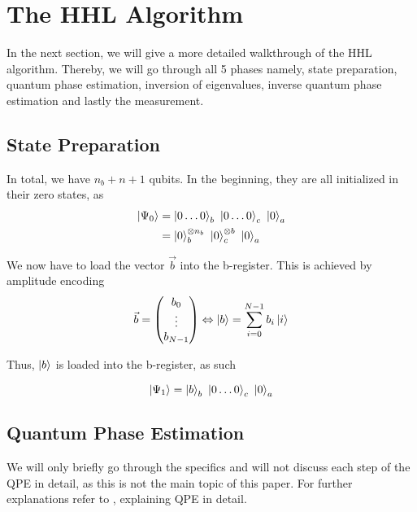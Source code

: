 \section{The HHL Algorithm}
In the next section, we will give a more detailed walkthrough of the HHL algorithm.
Thereby, we will go through all 5 phases namely, state preparation, quantum phase estimation, inversion of eigenvalues, inverse quantum phase estimation and lastly the measurement.

\subsection{State Preparation}

In total, we have $n_b + n + 1$ qubits. 
In the beginning, they are all initialized in their zero states, as
\begin{equation}
\begin{split}
\ket{\Psi_0} &= \ket{0\dots0}_b\ \ket{0\dots0}_c\ \ket{0}_a \\
&= \ket{0}_b^{{\otimes n_b}}\ \ket{0}_c^{\otimes b}\ \ket{0}_a 
\end{split}
\end{equation}

We now have to load the vector $\vec{b}$ into the b-register. 
This is achieved by amplitude encoding
\begin{equation}
    \vec{b} = \begin{pmatrix} b_0\\ \vdots \\ b_{N-1} \end{pmatrix} 
    \Leftrightarrow  
     \ket b = \sum_{i=0}^{N-1} b_i \ket i
\end{equation}

Thus, $\ket b$ is loaded into the b-register, as such

\begin{equation}
\ket{\Psi_1} = \ket{b}_b\ \ket{0\dots0}_c\ \ket{0}_a
\end{equation}

\subsection{Quantum Phase Estimation}
We will only briefly go through the specifics  and will not discuss each step of the QPE in detail, as this is not the main topic of this paper. 
For further explanations refer to \cite{qpe}, explaining QPE in detail.

